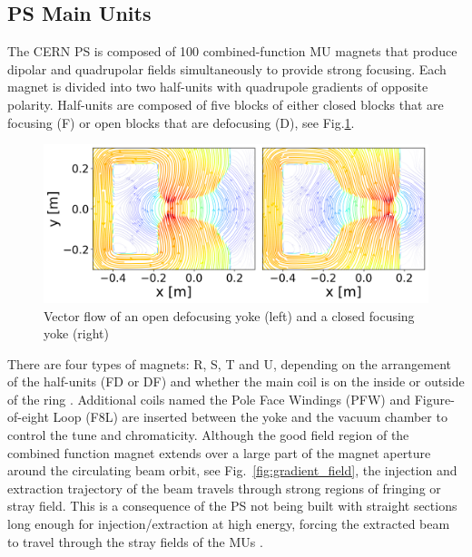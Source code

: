\documentclass[a4paper,
               biblatex,     %
               keeplastbox,   %
               ]{jacow}
\begin{document}
\subsection{PS Main Units}
The CERN PS is composed of 100 combined-function MU magnets that produce dipolar and quadrupolar fields simultaneously to provide strong focusing. Each magnet is divided into two half-units with quadrupole gradients of opposite polarity. Half-units are composed of five blocks of either closed blocks that are focusing (F) or open blocks that are defocusing (D), see Fig.\ref{fig:streamplot}.

\begin{figure}[!htb]
   \centering
   \includegraphics*[width=1.0\columnwidth]{streamplot_defocusing_focusing.png}
   \caption{Vector flow of an open defocusing yoke (left) and a closed focusing yoke (right)}
   \label{fig:streamplot}
\end{figure}

There are four types of magnets: R, S, T and U, depending on the arrangement of the half-units (FD or DF) and whether the main coil is on the inside or outside of the ring \cite{steerenberg_fifty_2011}. Additional coils named the Pole Face Windings (PFW) and Figure-of-eight Loop (F8L) are inserted between the yoke and the vacuum chamber to control the tune and chromaticity. Although the good field region of the combined function magnet extends over a large part of the magnet aperture around the circulating beam orbit, see Fig.~\ref{fig:gradient_field}, the injection and extraction trajectory of the beam travels through strong regions of fringing or stray field. This is a consequence of the PS not being built with straight sections long enough for injection/extraction at high energy, forcing the extracted beam to travel through the stray fields of the MUs \cite{risselada_beam_nodate}.
\end{document}
